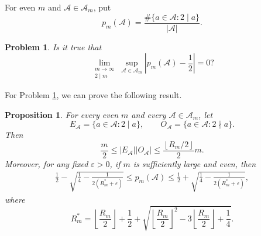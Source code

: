 \documentclass[12pt,a4paper,reqno]{amsart}
\numberwithin{equation}{section}
\newcommand{\floor}[1]{\left\lfloor #1\right\rfloor}
\theoremstyle{plain}
\newtheorem{problem}{Problem}
\newtheorem{proposition}{Proposition}
\theoremstyle{definition}
\begin{document}
For even $m$ and $\mathcal A\in\mathscr A_m$, put
\[
p_m(\mathcal A)=\frac{\#\big\{a\in\mathcal{A}: 2\mid a\big\}}{|\mathcal{A}|}.
\]

\begin{problem}\label{probl:3}
Is it true that 
\[
\lim_{\substack{m\to\infty\\ 2\mid m}}\sup_{\mathcal A\in\mathscr A_m}\left|p_m(\mathcal A)-\frac12\right|=0?
\]
\end{problem}

For Problem \ref{probl:3}, we can prove the following result.

\begin{proposition}\label{pro-prob-3}
For every even $m$ and every $\mathcal A\in\mathscr A_m$, let
\[
E_{\mathcal A}=\big\{a\in\mathcal A:2\mid a\big\},\qquad
O_{\mathcal A}=\big\{a\in\mathcal A:2\nmid a\big\}.
\]
Then
\[
\frac m2\le |E_{\mathcal A}||O_{\mathcal A}|
\le \frac{\floor{R_m/2}}{2}m.
\]
Moreover, for any fixed $\varepsilon>0$, if $m$ is sufficiently large and even, then
\begin{align*}
\frac{1}{2}-\sqrt{\frac{1}{4}-\frac{1}{2(R_m^*+\varepsilon)}}
\le p_m(\mathcal A)
\le
\frac{1}{2}+\sqrt{\frac{1}{4}-\frac{1}{2(R_m^*+\varepsilon)}},
\end{align*}
where 
$$
R_m^*=\floor{\frac{R_m}{2}}+\frac{1}{2}+\sqrt{\floor{\frac{R_m}{2}}^2-3\floor{\frac{R_m}{2}}+\frac{1}{4}}.
$$
\end{proposition}
\end{document}
